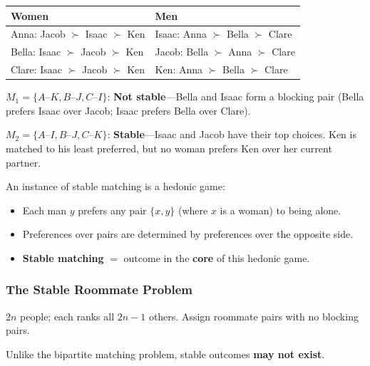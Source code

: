 \begin{exbox}
\begin{center}
\renewcommand{\arraystretch}{1.2}
\begin{tabular}{@{} l l @{}}
\toprule
\textbf{Women} & \textbf{Men} \\
\midrule
Anna: Jacob $\succ$ Isaac $\succ$ Ken & Isaac: Anna $\succ$ Bella $\succ$ Clare \\
Bella: Isaac $\succ$ Jacob $\succ$ Ken & Jacob: Bella $\succ$ Anna $\succ$ Clare \\
Clare: Isaac $\succ$ Jacob $\succ$ Ken & Ken: Anna $\succ$ Bella $\succ$ Clare \\
\bottomrule
\end{tabular}
\end{center}

$M_1 = \{A\text{--}K, B\text{--}J, C\text{--}I\}$: \textbf{Not stable}---Bella and Isaac form a blocking pair (Bella prefers Isaac over Jacob; Isaac prefers Bella over Clare).

$M_2 = \{A\text{--}I, B\text{--}J, C\text{--}K\}$: \textbf{Stable}---Isaac and Jacob have their top choices. Ken is matched to his least preferred, but no woman prefers Ken over her current partner.
\end{exbox}

\begin{defbox}
An instance of stable matching is a hedonic game:
\begin{itemize}
  \item Each man $y$ prefers any pair $\{x, y\}$ (where $x$ is a woman) to being alone.
  \item Preferences over pairs are determined by preferences over the opposite side.
  \item \textbf{Stable matching} $=$ outcome in the \textbf{core} of this hedonic game.
\end{itemize}
\end{defbox}

\separator

\subsubsection{The Stable Roommate Problem}

\begin{defbox}
$2n$ people; each ranks all $2n - 1$ others. Assign roommate pairs with no blocking pairs.

Unlike the bipartite matching problem, stable outcomes \textbf{may not exist}.
\end{defbox}

